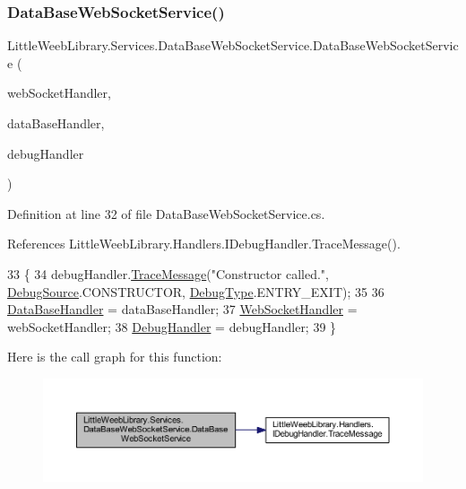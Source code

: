 \subsubsection{\texorpdfstring{Data\+Base\+Web\+Socket\+Service()}{DataBaseWebSocketService()}}
{\footnotesize\ttfamily Little\+Weeb\+Library.\+Services.\+Data\+Base\+Web\+Socket\+Service.\+Data\+Base\+Web\+Socket\+Service (\begin{DoxyParamCaption}\item[{\mbox{\hyperlink{interface_little_weeb_library_1_1_handlers_1_1_i_web_socket_handler}{I\+Web\+Socket\+Handler}}}]{web\+Socket\+Handler,  }\item[{\mbox{\hyperlink{interface_little_weeb_library_1_1_handlers_1_1_i_data_base_handler}{I\+Data\+Base\+Handler}}}]{data\+Base\+Handler,  }\item[{\mbox{\hyperlink{interface_little_weeb_library_1_1_handlers_1_1_i_debug_handler}{I\+Debug\+Handler}}}]{debug\+Handler }\end{DoxyParamCaption})}



Definition at line 32 of file Data\+Base\+Web\+Socket\+Service.\+cs.



References Little\+Weeb\+Library.\+Handlers.\+I\+Debug\+Handler.\+Trace\+Message().


\begin{DoxyCode}
33         \{
34             debugHandler.\mbox{\hyperlink{interface_little_weeb_library_1_1_handlers_1_1_i_debug_handler_a2e405bc3492e683cd3702fae125221bc}{TraceMessage}}(\textcolor{stringliteral}{"Constructor called."}, 
      \mbox{\hyperlink{namespace_little_weeb_library_1_1_handlers_a2a6ca0775121c9c503d58aa254d292be}{DebugSource}}.CONSTRUCTOR, \mbox{\hyperlink{namespace_little_weeb_library_1_1_handlers_ab66019ed40462876ec4e61bb3ccb0a62}{DebugType}}.ENTRY\_EXIT);
35 
36             \mbox{\hyperlink{class_little_weeb_library_1_1_handlers_1_1_data_base_handler}{DataBaseHandler}} = dataBaseHandler;
37             \mbox{\hyperlink{class_little_weeb_library_1_1_handlers_1_1_web_socket_handler}{WebSocketHandler}} = webSocketHandler;
38             \mbox{\hyperlink{class_little_weeb_library_1_1_handlers_1_1_debug_handler}{DebugHandler}} = debugHandler;
39         \}
\end{DoxyCode}
Here is the call graph for this function\+:\nopagebreak
\begin{figure}[H]
\begin{center}
\leavevmode
\includegraphics[width=350pt]{class_little_weeb_library_1_1_services_1_1_data_base_web_socket_service_a052238e0026967e104db0c6723923c7b_cgraph}
\end{center}
\end{figure}


